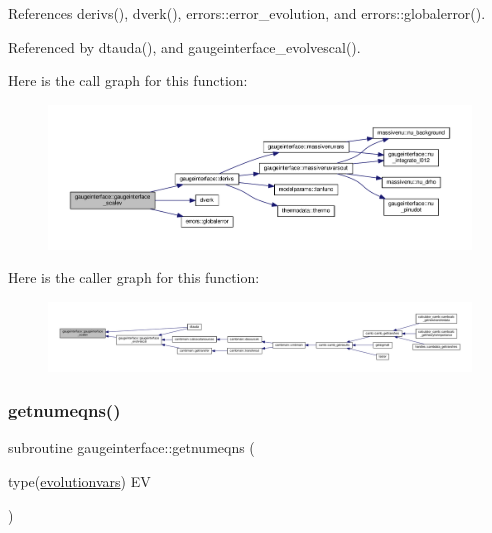 References derivs(), dverk(), errors\+::error\+\_\+evolution, and errors\+::globalerror().



Referenced by dtauda(), and gaugeinterface\+\_\+evolvescal().

Here is the call graph for this function\+:
\nopagebreak
\begin{figure}[H]
\begin{center}
\leavevmode
\includegraphics[width=350pt]{namespacegaugeinterface_ac02938234bdca8dcd23649b1abb34ab3_cgraph}
\end{center}
\end{figure}
Here is the caller graph for this function\+:
\nopagebreak
\begin{figure}[H]
\begin{center}
\leavevmode
\includegraphics[width=350pt]{namespacegaugeinterface_ac02938234bdca8dcd23649b1abb34ab3_icgraph}
\end{center}
\end{figure}
\mbox{\label{namespacegaugeinterface_ad273d68dadb4d4fcc10422fed213ca25}} 
\subsubsection{\texorpdfstring{getnumeqns()}{getnumeqns()}}
{\footnotesize\ttfamily subroutine gaugeinterface\+::getnumeqns (\begin{DoxyParamCaption}\item[{type(\mbox{\hyperlink{structgaugeinterface_1_1evolutionvars}{evolutionvars}})}]{EV }\end{DoxyParamCaption})}



